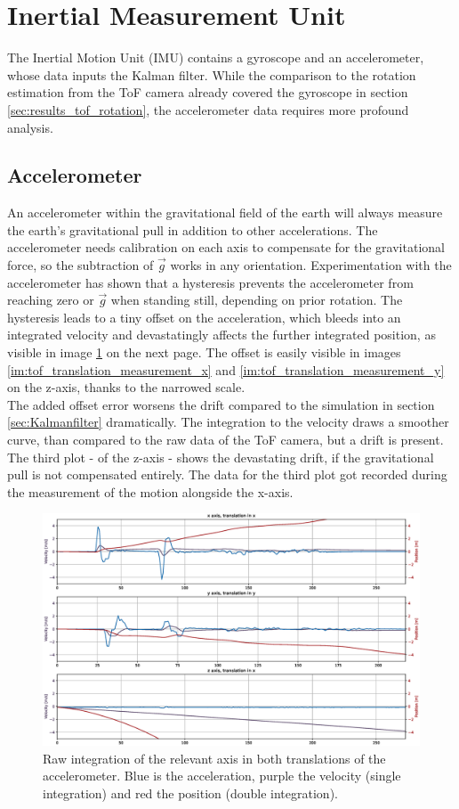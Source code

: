 \section{Inertial Measurement Unit}
\label{sec:IMU_results}
The Inertial Motion Unit (IMU) contains a gyroscope and an accelerometer, whose data inputs the Kalman filter. While the comparison to the rotation estimation from the ToF camera already covered the gyroscope in section \ref{sec:results_tof_rotation}, the accelerometer data requires more profound analysis.
\subsection{Accelerometer}
\label{sec:accel_results}
An accelerometer within the gravitational field of the earth will always measure the earth's gravitational pull in addition to other accelerations. The accelerometer needs calibration on each axis to compensate for the gravitational force, so the subtraction of $\vec{g}$ works in any orientation. Experimentation with the accelerometer has shown that a hysteresis prevents the accelerometer from reaching zero or $\vec{g}$ when standing still, depending on prior rotation. The hysteresis leads to a tiny offset on the acceleration, which bleeds into an integrated velocity and devastatingly affects the further integrated position, as visible in image \ref{im:accelometer_integrated} on the next page. The offset is easily visible in images \ref{im:tof_translation_measurement_x} and \ref{im:tof_translation_measurement_y} on the z-axis, thanks to the narrowed scale.\\
The added offset error worsens the drift compared to the simulation in section \ref{sec:Kalmanfilter} dramatically. The integration to the velocity draws a smoother curve, than compared to the raw data of the ToF camera, but a drift is present. The third plot - of the z-axis - shows the devastating drift, if the gravitational pull is not compensated entirely. The data for the third plot got recorded during the measurement of the motion alongside the x-axis.
\begin{figure}[H]
  \centering
  \includegraphics[width=1.0\textwidth]{images/accelerometer_translation_drift.eps}
  \caption{Raw integration of the relevant axis in both translations of the accelerometer. Blue is the acceleration, purple the velocity (single integration) and red the position (double integration).}
  \label{im:accelometer_integrated}
\end{figure} 
